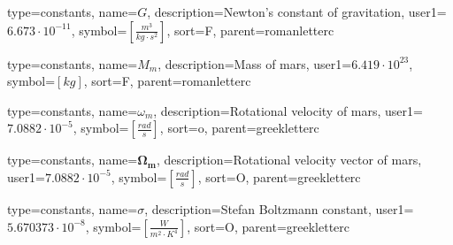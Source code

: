 {
type=constants, %
name={\ensuremath{G}}, %
description={Newton's constant of gravitation}, %
user1={$6.673\cdot10^{-11}$}, %
symbol={$\left[\frac{m^3}{kg \cdot s^{2}}\right]$}, %
sort=F, %
parent=romanletterc %
}

{
type=constants, %
name={\ensuremath{M_{m}}}, %
description={Mass of mars}, %
user1={$6.419\cdot10^{23}$}, %
symbol={$\left[kg\right]$}, %
sort=F, %
parent=romanletterc %
}

{
type=constants, %
name={\ensuremath{\omega_{m}}}, %
description={Rotational velocity of mars}, %
user1={$7.0882\cdot10^{-5}$}, %
symbol={$\left[\frac{rad}{s}\right]$}, %
sort=o, %
parent=greekletterc %
}

{
type=constants, %
name={\ensuremath{\mathbf{\Omega_{m}}}}, %
description={Rotational velocity vector of mars}, %
user1={$7.0882\cdot10^{-5}$}, %
symbol={$\left[\frac{rad}{s}\right]$}, %
sort=O, %
parent=greekletterc %
}

{
	type=constants, %
	name={\ensuremath{\sigma}}, %
	description={Stefan Boltzmann constant}, %
	user1={$5.670373\cdot10^{-8}$}, %
	symbol={$\left[\frac{W}{m^2\cdot K^4}\right]$}, %
	sort=O, %
	parent=greekletterc %
}